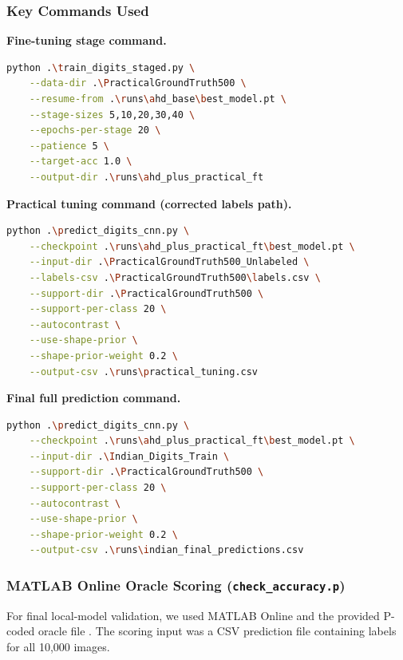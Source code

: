\subsubsection{Key Commands Used}

\noindent\textbf{Fine-tuning stage command.}
\begin{lstlisting}[language=bash]
python .\train_digits_staged.py \
    --data-dir .\PracticalGroundTruth500 \
    --resume-from .\runs\ahd_base\best_model.pt \
    --stage-sizes 5,10,20,30,40 \
    --epochs-per-stage 20 \
    --patience 5 \
    --target-acc 1.0 \
    --output-dir .\runs\ahd_plus_practical_ft
\end{lstlisting}

\noindent\textbf{Practical tuning command (corrected labels path).}
\begin{lstlisting}[language=bash]
python .\predict_digits_cnn.py \
    --checkpoint .\runs\ahd_plus_practical_ft\best_model.pt \
    --input-dir .\PracticalGroundTruth500_Unlabeled \
    --labels-csv .\PracticalGroundTruth500\labels.csv \
    --support-dir .\PracticalGroundTruth500 \
    --support-per-class 20 \
    --autocontrast \
    --use-shape-prior \
    --shape-prior-weight 0.2 \
    --output-csv .\runs\practical_tuning.csv
\end{lstlisting}

\noindent\textbf{Final full prediction command.}
\begin{lstlisting}[language=bash]
python .\predict_digits_cnn.py \
    --checkpoint .\runs\ahd_plus_practical_ft\best_model.pt \
    --input-dir .\Indian_Digits_Train \
    --support-dir .\PracticalGroundTruth500 \
    --support-per-class 20 \
    --autocontrast \
    --use-shape-prior \
    --shape-prior-weight 0.2 \
    --output-csv .\runs\indian_final_predictions.csv
\end{lstlisting}

\subsubsection{MATLAB Online Oracle Scoring (\texttt{check\_accuracy.p})}

For final local-model validation, we used MATLAB Online and the provided P-coded oracle file . The scoring input was a CSV prediction file containing labels for all 10,000 images.

